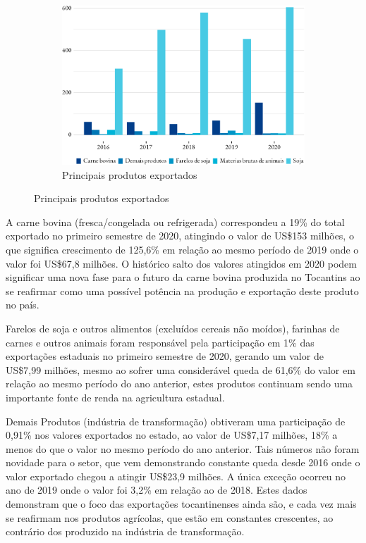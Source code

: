 \begin{figure}[!h]
	\begin{subfigure}{\linewidth}
		\caption{Principais produtos exportados}
		\includegraphics{fig/produtos_expo-1.pdf}
	\end{subfigure}
\end{figure}


A carne bovina (fresca/congelada ou refrigerada) correspondeu a 19\% do total exportado no primeiro semestre de 2020, atingindo o valor de US\$153 milhões, o que significa crescimento de 125,6\% em relação ao mesmo período de 2019 onde o valor foi US\$67,8 milhões. O histórico salto dos valores atingidos em 2020 podem significar uma nova fase para o futuro da carne bovina produzida no Tocantins ao se reafirmar como uma possível potência na produção e exportação deste produto no país.


Farelos de soja e outros alimentos (excluídos cereais não moídos), farinhas de carnes e outros animais foram responsável pela participação em 1\% das exportações estaduais no primeiro semestre de 2020, gerando um valor de US\$7,99 milhões, mesmo ao sofrer uma considerável queda de 61,6\% do valor em relação ao mesmo período do ano anterior, estes produtos continuam sendo uma importante fonte de renda na agricultura estadual.


Demais Produtos (indústria de transformação) obtiveram uma participação de 0,91\% nos valores exportados no estado, ao valor de US\$7,17 milhões, 18\% a menos do que o valor no mesmo período do ano anterior. Tais números não foram novidade para o setor, que vem demonstrando constante queda desde 2016 onde o valor exportado chegou a atingir US\$23,9 milhões. A única exceção ocorreu no ano de 2019 onde o valor foi 3,2\% em relação ao de 2018. Estes dados demonstram que o foco das exportações tocantinenses ainda são, e cada vez mais se reafirmam nos produtos agrícolas, que estão em constantes crescentes, ao contrário dos produzido na indústria de transformação.


